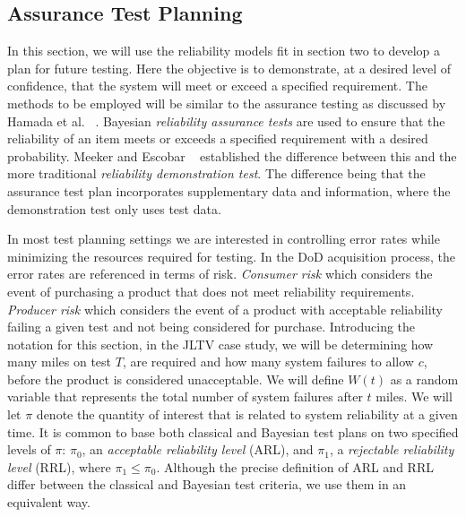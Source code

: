 \documentclass[12pt]{article}
\begin{document}
\subsection{Assurance Test Planning}
In this section, we will use the reliability models fit in section two to
develop a plan for future testing.  Here the objective is to demonstrate, at
a desired level of confidence, that the system will meet or exceed a specified
requirement. The methods to be employed will be similar to the assurance testing
as discussed by Hamada et al. ~\cite{ref6}. Bayesian \emph{reliability assurance
tests} are used to ensure that the reliability of an item meets or exceeds a
specified requirement with a desired probability. Meeker and Escobar
~\cite{ref7} established the difference between this and the more traditional
\emph{reliability demonstration test}.  The difference being that the assurance
test plan incorporates supplementary data and information, where the
demonstration test only uses test data.

In most test planning settings we are interested in controlling error rates
while minimizing the resources required for testing.  In the DoD acquisition
process, the error rates are referenced in terms of risk. \emph{Consumer
risk} which considers the event of purchasing a product that does not meet
reliability requirements.  \emph{Producer risk} which considers the event of a
product with acceptable reliability failing a given test and not being
considered for purchase.  Introducing the notation for this section, in the JLTV
case study, we will be determining how many miles on test $T$, are required and
how many system failures to allow $c$, before the product is considered
unacceptable.  We will define $W(t)$ as a random variable that represents the
total number of system failures after $t$ miles.  We will let $\pi$ denote the
quantity of interest that is related to system reliability at a given time. It
is common to base both classical and Bayesian test plans on two specified levels
of $\pi$: $\pi_0$, an \emph{acceptable reliability level} (ARL), and $\pi_1$, a
\emph{rejectable reliability level} (RRL), where $\pi_1 \leq  \pi_0$. Although
the precise definition of ARL and RRL differ between the classical and Bayesian
test criteria, we use them in an equivalent way.
\end{document}
